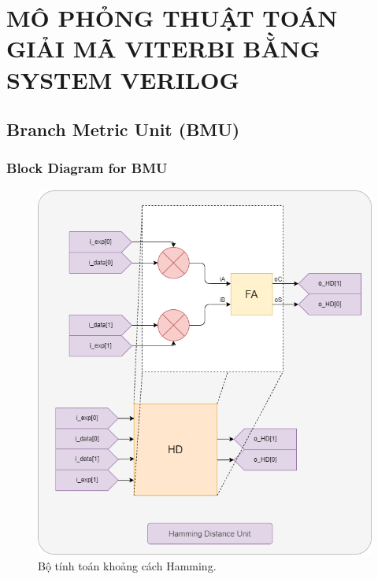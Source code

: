 \section{MÔ PHỎNG THUẬT TOÁN GIẢI MÃ VITERBI BẰNG SYSTEM VERILOG}

\subsection{Branch Metric Unit (BMU)}

\subsubsection{Block Diagram for BMU}

\begin{figure}[H]
	\centering
	\includegraphics[width=.8\linewidth]{sections/pic/mophongbangSystemVerilog/HD_unit.png}
	\caption{Bộ tính toán khoảng cách Hamming.}
\end{figure}


